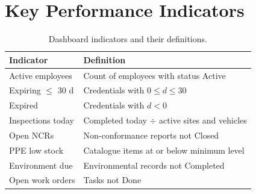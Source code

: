 \documentclass[11pt]{article}
\begin{document}
\appendix
\section{Key Performance Indicators}
\begin{table}[H]
\centering\small
\begin{tabular}{@{}l p{8.5cm}@{}}
\toprule
\textbf{Indicator} & \textbf{Definition} \\
\midrule
Active employees      & Count of employees with status \textsf{Active} \\
Expiring $\leq$ 30 d  & Credentials with $0 \leq d \leq 30$ \\
Expired               & Credentials with $d < 0$ \\
Inspections today     & Completed today $\div$ active sites and vehicles \\
Open NCRs             & Non-conformance reports not \textsf{Closed} \\
PPE low stock         & Catalogue items at or below minimum level \\
Environment due       & Environmental records not \textsf{Completed} \\
Open work orders      & Tasks not \textsf{Done} \\
\bottomrule
\end{tabular}
\caption{Dashboard indicators and their definitions.}
\end{table}
\end{document}

